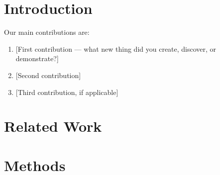 \documentclass[11pt,a4paper]{article}   %
\newif\ifguidance
\newcommand{\guide}[1]{\ifguidance\textcolor{guidegray}{\itshape #1}\par\medskip\fi}
\begin{document}
\section{Introduction}
\guide{What problem are you addressing and why does it matter? Connect it to your
work: we want to know why your work is practically valuable. Provide enough
background for readers to understand your work. If relevant, briefly describe the
threat model or failure mode you're addressing; reference prior work that motivates
why it is worth addressing, or explain it yourself. Aspire to clearly list your most
important contributions that go beyond what exists today.}

Our main contributions are:
\begin{enumerate}[leftmargin=*,itemsep=2pt]
  \item {[First contribution --- what new thing did you create, discover, or demonstrate?]}
  \item {[Second contribution]}
  \item {[Third contribution, if applicable]}
\end{enumerate}

\section{Related Work}
\guide{What prior work is most similar, and how does your work differ? Cite the most
relevant papers, tools, or projects. Explain what gap your work addresses. Some
questions which may help: (a) When and why would someone use your method over the
existing state-of-the-art? (b) What information/insight does your method provide
which we did not have before?}

\section{Methods}
\guide{Describe your approach clearly enough that someone could replicate it.
Include key design choices and justify them where relevant (hint: the more you can
back up your design choices by referencing prior work, the better). What
models/datasets/tools did you use and why? What were key parameters or design
decisions? What did you try that didn't work? Could someone reproduce your work from
this description?}
\end{document}
